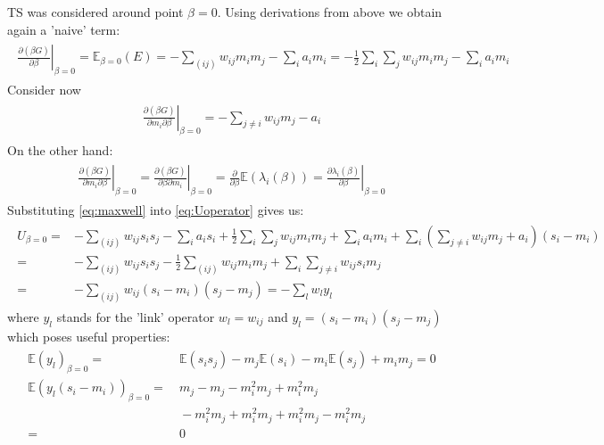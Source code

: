 \documentclass[12pt,a4paper]{article}
\begin{document}
TS was considered around point $\beta =0$. Using derivations from above we obtain again a 'naive' term:
\begin{align}
\begin{split}
\left. \frac{\partial (\beta G)}{\partial \beta} \right|_{\beta =0} = \mathbb{E} _{\beta = 0}(E) = - \sum_{(ij)} w_{ij} m_i m_j - \sum_i a_i m_i = - \frac{1}{2} \sum_i \sum_j w_{ij}m_i m_j - \sum_i a_i m_i
\end{split}
\end{align}
Consider now 
\begin{align}
\begin{split}
\left.\frac{\partial (\beta G)}{\partial m_i \partial \beta}\right|_{\beta = 0} = 
- \sum_{j \neq i} w_{ij} m_j - a_i
\end{split}
\end{align}
On the other hand:
\begin{align}
\begin{split}
\left. \frac{\partial (\beta G)}{\partial m_i \partial \beta}\right|_{\beta = 0} = \left. \frac{\partial (\beta G)}{\partial \beta \partial m_i }\right|_{\beta = 0} = \frac{\partial}{\partial \beta} \mathbb{E} (\lambda_i(\beta)) =  \left. \frac{\partial \lambda_i (\beta)}{\partial \beta}\right|_{\beta =0}
 \label{eq:maxwell}
 \end{split}
\end{align}
Substituting  \ref{eq:maxwell} into  \ref{eq:Uoperator} gives us:
\begin{align}
\begin{split}
U_{\beta = 0} = & -\sum_{(ij)} w_{ij}s_is_j -\sum_i a_i s_i + \frac{1}{2} \sum_i \sum_j w_{ij} m_i m_j + \sum_i a_i m_i + \sum_i \left(\sum_{j \neq i} w_{ij} m_j  + a_i\right)(s_i - m_i ) \\
= & -\sum_{(ij)} w_{ij}s_i s_j - \frac{1}{2}\sum_{(ij)} w_{ij} m_i m_j + \sum_i \sum_{j \neq i} w_{ij} s_i m_j \\
= & - \sum_{(ij)} w_{ij} (s_i - m_i)(s_j- m_j) = - \sum_l w_l y_l
 \end{split}
\end{align}
where $y_l$ stands for the 'link' operator $w_l = w_{ij}$ and $y_l = (s_i -m_i)(s_j-m_j)$ which poses useful properties:
\begin{align}
\begin{split}
\mathbb{E}(y_l)_{\beta =0} = & ~\mathbb{E}(s_i s_j) -m_j\mathbb{E}(s_i) - m_i\mathbb{E}(s_j) + m_i m_j = 0 \\
\mathbb{E}(y_l(s_i-m_i))_{\beta =0} = & ~ m_j - m_j -m_i^2m_j + m_i^2m_j \\
 & ~ - m_i^2m_j + m_i^2m_j + m_i^2m_j - m_i^2m_j \\
 = &~ 0
 \end{split}
\end{align}
\end{document}
